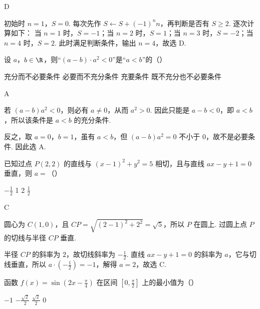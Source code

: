 \begin{answer}
D
\end{answer}

\begin{solution}
初始时 \(n=1\)，\(S=0\). 每次先作 \(S\leftarrow S+(-1)^n n\)，再判断是否有 \(S\geqslant 2\). 逐次计算如下：
当 \(n=1\) 时，\(S=-1\)；当 \(n=2\) 时，\(S=1\)；当 \(n=3\) 时，\(S=-2\)；当 \(n=4\) 时，\(S=2\). 此时满足判断条件，输出 \(n=4\)，故选 D.
\end{solution}

\begin{problem}
设 \(a\)，\(b \in \R\)，则“\((a - b) \cdot a^2 < 0\)”是“\(a < b\)”的（\quad）

\choices
    {充分而不必要条件}
    {必要而不充分条件}
    {充要条件}
    {既不充分也不必要条件}
\end{problem}

\begin{answer}
A
\end{answer}

\begin{solution}
若 \((a-b)a^2<0\)，则必有 \(a\neq 0\)，从而 \(a^2>0\). 因此只能是 \(a-b<0\)，即 \(a<b\)，所以该条件是 \(a<b\) 的充分条件.

反之，取 \(a=0\)，\(b=1\)，虽有 \(a<b\)，但 \((a-b)a^2=0\) 不小于 \(0\)，故不是必要条件. 因此选 A.
\end{solution}

\begin{problem}
已知过点 \(P(2,2)\) 的直线与 \((x - 1)^2 + y^2 = 5\) 相切，且与直线 \(ax - y + 1 = 0\) 垂直，则 \(a =\)（\quad）

\choices
    {\(-\frac{1}{2}\)}
    {1}
    {2}
    {\(\frac{1}{2}\)}
\end{problem}

\begin{answer}
C
\end{answer}

\begin{solution}
圆心为 \(C(1,0)\)，且 \(CP=\sqrt{(2-1)^2+2^2}=\sqrt{5}\)，所以 \(P\) 在圆上. 过圆上点 \(P\) 的切线与半径 \(CP\) 垂直.

半径 \(CP\) 的斜率为 \(2\)，故切线斜率为 \(-\frac{1}{2}\). 直线 \(ax-y+1=0\) 的斜率为 \(a\)，它与切线垂直，所以
\(a\cdot\left(-\frac{1}{2}\right)=-1\)，解得 \(a=2\)，故选 C.
\end{solution}

\begin{problem}
函数 \( f(x) = \sin \left(2x - \frac{\pi}{4}\right) \) 在区间 \(\left[0, \frac{\pi}{2}\right]\) 上的最小值为（\quad）

\choices
    {\(-1\)}
    {\(-\frac{\sqrt{2}}{2}\)}
    {\(\frac{\sqrt{2}}{2}\)}
    {0}
\end{problem}

